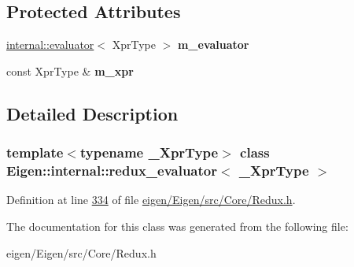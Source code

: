 \subsection*{Protected Attributes}
\begin{DoxyCompactItemize}
\item 
\mbox{\label{class_eigen_1_1internal_1_1redux__evaluator_ab19dda5e3c478b5ef861a18b6ddeda73}} 
\hyperlink{struct_eigen_1_1internal_1_1evaluator}{internal\+::evaluator}$<$ Xpr\+Type $>$ {\bfseries m\+\_\+evaluator}
\item 
\mbox{\label{class_eigen_1_1internal_1_1redux__evaluator_a910641e4da1d3ffe7adf4dadbe10da97}} 
const Xpr\+Type \& {\bfseries m\+\_\+xpr}
\end{DoxyCompactItemize}


\subsection{Detailed Description}
\subsubsection*{template$<$typename \+\_\+\+Xpr\+Type$>$\newline
class Eigen\+::internal\+::redux\+\_\+evaluator$<$ \+\_\+\+Xpr\+Type $>$}



Definition at line \hyperlink{eigen_2_eigen_2src_2_core_2_redux_8h_source_l00334}{334} of file \hyperlink{eigen_2_eigen_2src_2_core_2_redux_8h_source}{eigen/\+Eigen/src/\+Core/\+Redux.\+h}.



The documentation for this class was generated from the following file\+:\begin{DoxyCompactItemize}
\item 
eigen/\+Eigen/src/\+Core/\+Redux.\+h\end{DoxyCompactItemize}
